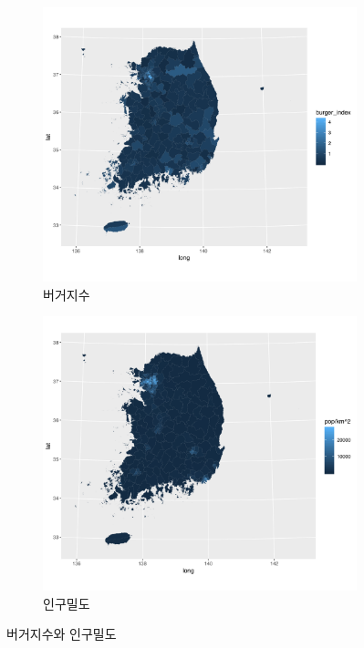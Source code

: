 \documentclass{scrartcl}
\begin{document}
\begin{figure}[!ht]
    \centering
    \begin{subfigure}[b]{0.475\textwidth}
        \centering
        \includegraphics[width=\textwidth]{../figs/bi_sig.png}
        \caption{버거지수}\label{fig:bi}
    \end{subfigure}
    \hfill
    \begin{subfigure}[b]{0.475\textwidth}
        \centering
        \includegraphics[width=\textwidth]{../figs/popden_sig.png}
        \caption{인구밀도}\label{fig:popden}
    \end{subfigure}
    \caption{버거지수와 인구밀도}\label{fig:biandpopden}
\end{figure}
\end{document}
